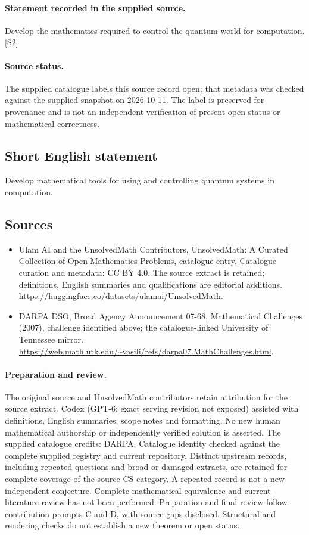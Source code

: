 \documentclass[11pt]{article}
\begin{document}
\paragraph{Statement recorded in the supplied source.}
Develop the mathematics required to control the quantum world for computation. \href{https://web.math.utk.edu/~vasili/refs/darpa07.MathChallenges.html}{[S2]}
\paragraph{Source status.}
The supplied catalogue labels this source record open; that metadata was checked against the supplied snapshot on 2026-10-11. The label is preserved for provenance and is not an independent verification of present open status or mathematical correctness.
\subsection{Short English statement}
Develop mathematical tools for using and controlling quantum systems in computation.
\subsection{Sources}
\begin{itemize}
\item[S1] Ulam AI and the UnsolvedMath Contributors, UnsolvedMath: A Curated Collection of Open Mathematics Problems, catalogue entry. Catalogue curation and metadata: CC BY 4.0. The source extract is retained; definitions, English summaries and qualifications are editorial additions.
\url{https://huggingface.co/datasets/ulamai/UnsolvedMath}.
\item[S2] DARPA DSO, Broad Agency Announcement 07-68, Mathematical Challenges (2007), challenge identified above; the catalogue-linked University of Tennessee mirror.
\url{https://web.math.utk.edu/~vasili/refs/darpa07.MathChallenges.html}.
\end{itemize}
\paragraph{Preparation and review.}
The original source and UnsolvedMath contributors retain attribution for the source extract. Codex (GPT-6; exact serving revision not exposed) assisted with definitions, English summaries, scope notes and formatting. No new human mathematical authorship or independently verified solution is asserted. The supplied catalogue credits: DARPA. Catalogue identity checked against the complete supplied registry and current repository. Distinct upstream records, including repeated questions and broad or damaged extracts, are retained for complete coverage of the source CS category. A repeated record is not a new independent conjecture. Complete mathematical-equivalence and current-literature review has not been performed. Preparation and final review follow contribution prompts C and D, with source gaps disclosed. Structural and rendering checks do not establish a new theorem or open status.
\label{end:statement}
\end{document}
